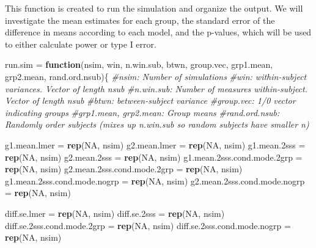 \documentclass[
]{book}
\newenvironment{Shaded}{\begin{snugshade}}{\end{snugshade}}
\newcommand{\CommentTok}[1]{\textcolor[rgb]{0.56,0.35,0.01}{\textit{#1}}}
\newcommand{\ControlFlowTok}[1]{\textcolor[rgb]{0.13,0.29,0.53}{\textbf{#1}}}
\newcommand{\FloatTok}[1]{\textcolor[rgb]{0.00,0.00,0.81}{#1}}
\newcommand{\KeywordTok}[1]{\textcolor[rgb]{0.13,0.29,0.53}{\textbf{#1}}}
\newcommand{\NormalTok}[1]{#1}
\newcommand{\OtherTok}[1]{\textcolor[rgb]{0.56,0.35,0.01}{#1}}
\newcommand{\StringTok}[1]{\textcolor[rgb]{0.31,0.60,0.02}{#1}}
\begin{document}
This function is created to run the simulation and organize the output. We will investigate the mean estimates for each group, the standard error of the difference in means according to each model, and the p-values, which will be used to either calculate power or type I error.

\begin{Shaded}
\begin{Highlighting}[]
\NormalTok{run.sim =}\StringTok{ }\ControlFlowTok{function}\NormalTok{(nsim, win, n.win.sub, btwn,  group.vec, grp1.mean, grp2.mean, rand.ord.nsub)\{}
  \CommentTok{\#nsim:  Number of simulations}
  \CommentTok{\#win: within{-}subject variances.  Vector of length nsub}
  \CommentTok{\#n.win.sub:  Number of measures within{-}subject.  Vector of length nsub}
  \CommentTok{\#btwn:  between{-}subject variance}
  \CommentTok{\#group.vec:  1/0 vector indicating groups}
  \CommentTok{\#grp1.mean, grp2.mean:  Group means}
  \CommentTok{\#rand.ord.nsub:  Randomly order subjects (mixes up n.win.sub so random subjects have smaller n)}
 
\NormalTok{  g1.mean.lmer =}\StringTok{ }\KeywordTok{rep}\NormalTok{(}\OtherTok{NA}\NormalTok{, nsim)}
\NormalTok{  g2.mean.lmer =}\StringTok{ }\KeywordTok{rep}\NormalTok{(}\OtherTok{NA}\NormalTok{, nsim)}
\NormalTok{  g1.mean}\FloatTok{.2}\NormalTok{sss =}\StringTok{ }\KeywordTok{rep}\NormalTok{(}\OtherTok{NA}\NormalTok{, nsim)}
\NormalTok{  g2.mean}\FloatTok{.2}\NormalTok{sss =}\StringTok{ }\KeywordTok{rep}\NormalTok{(}\OtherTok{NA}\NormalTok{, nsim)}
\NormalTok{  g1.mean}\FloatTok{.2}\NormalTok{sss.cond.mode}\FloatTok{.2}\NormalTok{grp =}\StringTok{ }\KeywordTok{rep}\NormalTok{(}\OtherTok{NA}\NormalTok{, nsim)}
\NormalTok{  g2.mean}\FloatTok{.2}\NormalTok{sss.cond.mode}\FloatTok{.2}\NormalTok{grp =}\StringTok{ }\KeywordTok{rep}\NormalTok{(}\OtherTok{NA}\NormalTok{, nsim)}
\NormalTok{  g1.mean}\FloatTok{.2}\NormalTok{sss.cond.mode.nogrp =}\StringTok{ }\KeywordTok{rep}\NormalTok{(}\OtherTok{NA}\NormalTok{, nsim)}
\NormalTok{  g2.mean}\FloatTok{.2}\NormalTok{sss.cond.mode.nogrp =}\StringTok{ }\KeywordTok{rep}\NormalTok{(}\OtherTok{NA}\NormalTok{, nsim)}
  
\NormalTok{  diff.se.lmer =}\StringTok{ }\KeywordTok{rep}\NormalTok{(}\OtherTok{NA}\NormalTok{, nsim)}
\NormalTok{  diff.se}\FloatTok{.2}\NormalTok{sss =}\StringTok{ }\KeywordTok{rep}\NormalTok{(}\OtherTok{NA}\NormalTok{, nsim)}
\NormalTok{  diff.se}\FloatTok{.2}\NormalTok{sss.cond.mode}\FloatTok{.2}\NormalTok{grp =}\StringTok{ }\KeywordTok{rep}\NormalTok{(}\OtherTok{NA}\NormalTok{, nsim)}
\NormalTok{  diff.se}\FloatTok{.2}\NormalTok{sss.cond.mode.nogrp =}\StringTok{ }\KeywordTok{rep}\NormalTok{(}\OtherTok{NA}\NormalTok{, nsim)}
  

\end{Highlighting}
\end{Shaded}
\end{document}
